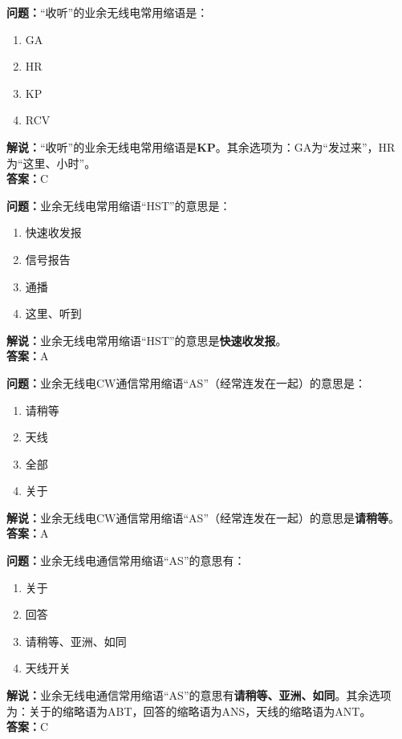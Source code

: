 \bigskip


\noindent\textbf{问题：}“收听”的业余无线电常用缩语是：
\begin{enumerate}[label=\Alph*), leftmargin=3em]
\item GA
\item HR
\item KP
\item RCV
\end{enumerate}
\noindent\textbf{解说：}“收听”的业余无线电常用缩语是\textbf{KP}。其余选项为：GA为“发过来”，HR为“这里、小时”。\\\noindent\textbf{答案：}C

\bigskip


\noindent\textbf{问题：}业余无线电常用缩语“HST”的意思是：
\begin{enumerate}[label=\Alph*), leftmargin=3em]
\item 快速收发报
\item 信号报告
\item 通播
\item 这里、听到
\end{enumerate}
\noindent\textbf{解说：}业余无线电常用缩语“HST”的意思是\textbf{快速收发报}。\\\noindent\textbf{答案：}A



\bigskip


\noindent\textbf{问题：}业余无线电CW通信常用缩语“AS”（经常连发在一起）的意思是：
\begin{enumerate}[label=\Alph*), leftmargin=3em]
\item 请稍等
\item 天线
\item 全部
\item 关于
\end{enumerate}
\noindent\textbf{解说：}业余无线电CW通信常用缩语“AS”（经常连发在一起）的意思是\textbf{请稍等}。\\\noindent\textbf{答案：}A

\bigskip


\noindent\textbf{问题：}业余无线电通信常用缩语“AS”的意思有：
\begin{enumerate}[label=\Alph*), leftmargin=3em]
\item 关于
\item 回答
\item 请稍等、亚洲、如同
\item 天线开关
\end{enumerate}
\noindent\textbf{解说：}业余无线电通信常用缩语“AS”的意思有\textbf{请稍等、亚洲、如同}。其余选项为：关于的缩略语为ABT，回答的缩略语为ANS，天线的缩略语为ANT。\\\noindent\textbf{答案：}C

